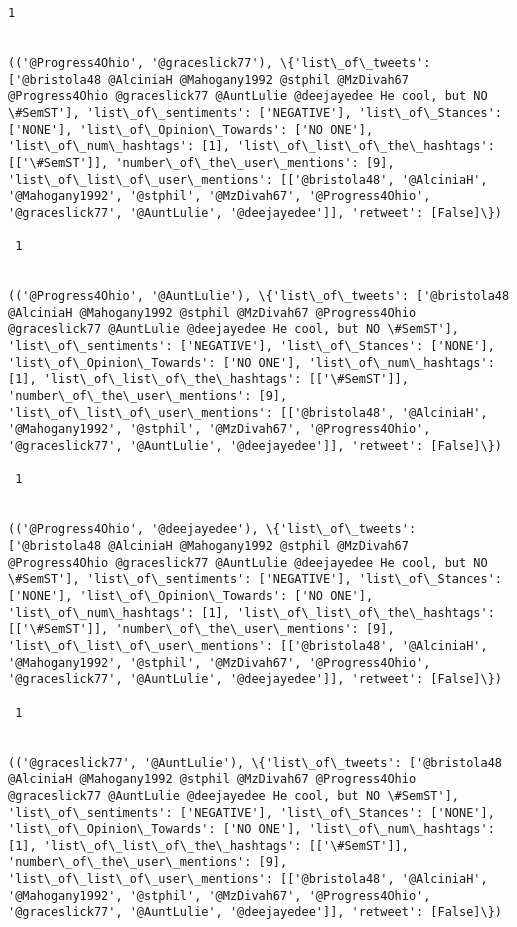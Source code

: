\documentclass[11pt]{article}
\begin{document}
\begin{Verbatim}[commandchars=\\\{\}]
 1
 

(('@Progress4Ohio', '@graceslick77'), \{'list\_of\_tweets': ['@bristola48 @AlciniaH @Mahogany1992 @stphil @MzDivah67 @Progress4Ohio @graceslick77 @AuntLulie @deejayedee He cool, but NO \#SemST'], 'list\_of\_sentiments': ['NEGATIVE'], 'list\_of\_Stances': ['NONE'], 'list\_of\_Opinion\_Towards': ['NO ONE'], 'list\_of\_num\_hashtags': [1], 'list\_of\_list\_of\_the\_hashtags': [['\#SemST']], 'number\_of\_the\_user\_mentions': [9], 'list\_of\_list\_of\_user\_mentions': [['@bristola48', '@AlciniaH', '@Mahogany1992', '@stphil', '@MzDivah67', '@Progress4Ohio', '@graceslick77', '@AuntLulie', '@deejayedee']], 'retweet': [False]\})

 1
 

(('@Progress4Ohio', '@AuntLulie'), \{'list\_of\_tweets': ['@bristola48 @AlciniaH @Mahogany1992 @stphil @MzDivah67 @Progress4Ohio @graceslick77 @AuntLulie @deejayedee He cool, but NO \#SemST'], 'list\_of\_sentiments': ['NEGATIVE'], 'list\_of\_Stances': ['NONE'], 'list\_of\_Opinion\_Towards': ['NO ONE'], 'list\_of\_num\_hashtags': [1], 'list\_of\_list\_of\_the\_hashtags': [['\#SemST']], 'number\_of\_the\_user\_mentions': [9], 'list\_of\_list\_of\_user\_mentions': [['@bristola48', '@AlciniaH', '@Mahogany1992', '@stphil', '@MzDivah67', '@Progress4Ohio', '@graceslick77', '@AuntLulie', '@deejayedee']], 'retweet': [False]\})

 1
 

(('@Progress4Ohio', '@deejayedee'), \{'list\_of\_tweets': ['@bristola48 @AlciniaH @Mahogany1992 @stphil @MzDivah67 @Progress4Ohio @graceslick77 @AuntLulie @deejayedee He cool, but NO \#SemST'], 'list\_of\_sentiments': ['NEGATIVE'], 'list\_of\_Stances': ['NONE'], 'list\_of\_Opinion\_Towards': ['NO ONE'], 'list\_of\_num\_hashtags': [1], 'list\_of\_list\_of\_the\_hashtags': [['\#SemST']], 'number\_of\_the\_user\_mentions': [9], 'list\_of\_list\_of\_user\_mentions': [['@bristola48', '@AlciniaH', '@Mahogany1992', '@stphil', '@MzDivah67', '@Progress4Ohio', '@graceslick77', '@AuntLulie', '@deejayedee']], 'retweet': [False]\})

 1
 

(('@graceslick77', '@AuntLulie'), \{'list\_of\_tweets': ['@bristola48 @AlciniaH @Mahogany1992 @stphil @MzDivah67 @Progress4Ohio @graceslick77 @AuntLulie @deejayedee He cool, but NO \#SemST'], 'list\_of\_sentiments': ['NEGATIVE'], 'list\_of\_Stances': ['NONE'], 'list\_of\_Opinion\_Towards': ['NO ONE'], 'list\_of\_num\_hashtags': [1], 'list\_of\_list\_of\_the\_hashtags': [['\#SemST']], 'number\_of\_the\_user\_mentions': [9], 'list\_of\_list\_of\_user\_mentions': [['@bristola48', '@AlciniaH', '@Mahogany1992', '@stphil', '@MzDivah67', '@Progress4Ohio', '@graceslick77', '@AuntLulie', '@deejayedee']], 'retweet': [False]\})


\end{Verbatim}
\end{document}

